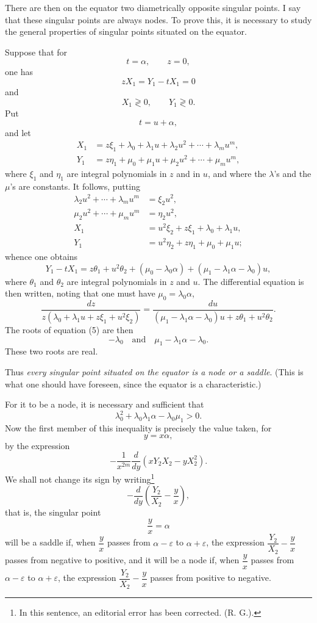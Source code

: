 \documentclass[11pt]{article}
\begin{document}
There are then on the equator two diametrically opposite singular points. I say that these singular points are always nodes. To prove this, it is necessary to study the general properties of singular points situated on the equator.

Suppose that for
\[
t=\alpha,\qquad z=0,
\]
one has
\[
zX_1=Y_1-tX_1=0
\]
and
\[
X_1\gtrless0,\qquad Y_1\gtrless0.
\]
Put
\[
t=u+\alpha,
\]
and let
\[
\begin{aligned}
X_1&=z\xi_1+\lambda_0+\lambda_1u+\lambda_2u^2+\cdots+\lambda_mu^m,\\
Y_1&=z\eta_1+\mu_0+\mu_1u+\mu_2u^2+\cdots+\mu_mu^m,
\end{aligned}
\]
where $\xi_1$ and $\eta_1$ are integral polynomials in $z$ and in $u$, and where the $\lambda$'s and the $\mu$'s are constants. It follows, putting
\[
\begin{aligned}
\lambda_2u^2+\cdots+\lambda_mu^m&=\xi_2u^2,\\
\mu_2u^2+\cdots+\mu_mu^m&=\eta_2u^2,\\
X_1&=u^2\xi_2+z\xi_1+\lambda_0+\lambda_1u,\\
Y_1&=u^2\eta_2+z\eta_1+\mu_0+\mu_1u;
\end{aligned}
\]
whence one obtains
\[
Y_1-tX_1=z\theta_1+u^2\theta_2+(\mu_0-\lambda_0\alpha)+(\mu_1-\lambda_1\alpha-\lambda_0)u,
\]
where $\theta_1$ and $\theta_2$ are integral polynomials in $z$ and $u$. The differential equation is then written, noting that one must have $\mu_0=\lambda_0\alpha$,
\[
\frac{dz}{z(\lambda_0+\lambda_1u+z\xi_1+u^2\xi_2)}=
\frac{du}{(\mu_1-\lambda_1\alpha-\lambda_0)u+z\theta_1+u^2\theta_2}.\tag{1}
\]
The roots of equation (5) are then
\[
-\lambda_0\quad\text{and}\quad \mu_1-\lambda_1\alpha-\lambda_0.
\]
These two roots are real.

Thus \emph{every singular point situated on the equator is a node or a saddle}. (This is what one should have foreseen, since the equator is a characteristic.)

For it to be a node, it is necessary and sufficient that
\[
\lambda_0^2+\lambda_0\lambda_1\alpha-\lambda_0\mu_1>0.
\]
Now the first member of this inequality is precisely the value taken, for
\[
y=x\alpha,
\]
by the expression
\[
-\frac1{x^{2m}}\frac{d}{dy}(xY_2X_2-yX_2^2).
\]
We shall not change its sign by writing\footnote{In this sentence, an editorial error has been corrected. (R. G.).}
\[
-\frac{d}{dy}\left(\frac{Y_2}{X_2}-\frac yx\right),
\]
that is, the singular point
\[
\frac yx=\alpha
\]
will be a saddle if, when $\dfrac yx$ passes from $\alpha-\varepsilon$ to $\alpha+\varepsilon$, the expression $\dfrac{Y_2}{X_2}-\dfrac yx$ passes from negative to positive, and it will be a node if, when $\dfrac yx$ passes from $\alpha-\varepsilon$ to $\alpha+\varepsilon$, the expression $\dfrac{Y_2}{X_2}-\dfrac yx$ passes from positive to negative.
\end{document}
